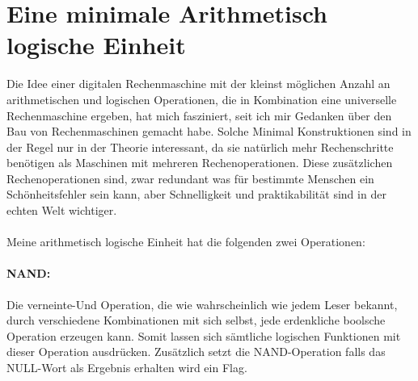 \documentclass[11pt,a4paper,leqno]{report}
\numberwithin{equation}{chapter}
\begin{document}
\section{Eine minimale Arithmetisch logische Einheit}
Die Idee einer digitalen Rechenmaschine mit der kleinst m\"oglichen Anzahl an arithmetischen und logischen Operationen, die in Kombination eine universelle Rechenmaschine ergeben, hat mich fasziniert, seit ich mir Gedanken \"uber den Bau von Rechenmaschinen gemacht habe. Solche Minimal Konstruktionen sind in der Regel nur
in der Theorie interessant, da sie nat\"urlich mehr Rechenschritte ben\"otigen als Maschinen mit mehreren Rechenoperationen. Diese zus\"atzlichen Rechenoperationen sind, zwar redundant was f\"ur bestimmte Menschen ein Sch\"onheitsfehler sein kann, aber Schnelligkeit und praktikabilit\"at sind in der echten Welt wichtiger.\\
\\
Meine arithmetisch logische Einheit hat die folgenden zwei Operationen:
\paragraph{NAND: } Die verneinte-Und Operation, die wie wahrscheinlich wie jedem Leser bekannt, durch verschiedene Kombinationen mit sich selbst, jede erdenkliche boolsche Operation erzeugen kann. Somit lassen sich s\"amtliche logischen Funktionen mit dieser Operation ausdr\"ucken. Zus\"atzlich setzt die NAND-Operation falls das NULL-Wort als Ergebnis erhalten wird ein Flag.
\end{document}
